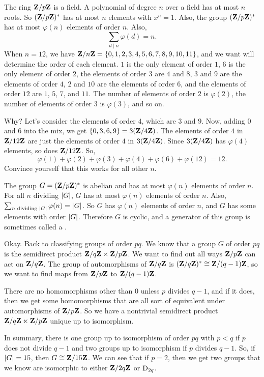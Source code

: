 \documentclass[11pt, oneside]{amsart}
\begin{document}
The ring $\mathbf Z / p\mathbf Z$ is a field. A polynomial of degree $n$ over a field has at most $n$ roots. So $(\mathbf Z / p\mathbf Z)^*$ has at most $n$ elements with $x^n = 1$. Also, the group $(\mathbf Z / p\mathbf Z)^*$ has at most $\varphi(n)$ elements of order $n$. Also, 
$$
\sum_{d\mid n} \varphi(d) = n.
$$
When $n=12$, we have $\mathbf Z / n\mathbf Z = \{0,1,2,3,4,5,6,7,8,9,10,11\}$, and we want will determine the order of each element. $1$ is the only element of order $1$, $6$ is the only element of order $2$, the elements of order $3$ are $4$ and $8$, $3$ and $9$ are the elements of order $4$, $2$ and $10$ are the elements of order $6$, and the elements of order $12$ are $1$, $5$, $7$, and $11$. The number of elements of order $2$ is $\varphi(2)$, the number of elements of order $3$ is $\varphi(3)$, and so on. 

Why? Let's consider the elements of order $4$, which are $3$ and $9$. Now, adding $0$ and $6$ into the mix, we get $ \{0,3,6,9\} = 3(\mathbf Z / 4\mathbf Z)$. The elements of order $4$ in $\mathbf Z / 12\mathbf Z$ are just the elements of order $4$ in $3(\mathbf Z / 4\mathbf Z)$. Since $3(\mathbf Z / 4\mathbf Z)$ has $\varphi(4) $ elements, so does $\mathbf Z / 12\mathbf Z$. So, 
$$
\varphi (1) + \varphi (2)  + \varphi (3) + \varphi (4) + \varphi (6) + \varphi (12) = 12.
$$
Convince yourself that this works for all other $n$.

The group $G = (\mathbf Z / p\mathbf Z)^*$ is abelian and has at most $\varphi (n) $ elements of order $n$. For all $n$ dividing $\left \lvert G \right \rvert$, $G$ has at most $\varphi(n)$ elements of order $n$. Also, $\sum_{n \textrm{ dividing } \left \lvert G \right \rvert} \varphi(n) = \left \lvert G \right \rvert$. So $G$ has $\varphi(n)$ elements of order $n$, and $G$ has some elements with order $\left \lvert G \right \rvert$. Therefore $G$ is cyclic, and a generator of this group is sometimes called a .

Okay. Back to classifying groups of order $pq$. We know that a group $G$ of order $pq$ is the semidirect product $\mathbf Z/q\mathbf Z \ltimes \mathbf Z / p\mathbf Z$. We want to find out all ways $\mathbf Z / p\mathbf Z$ can act on $\mathbf Z / q\mathbf Z$. The group of automorphisms of $\mathbf Z / q\mathbf Z$ is $(\mathbf Z / q\mathbf Z)^* \cong \mathbf Z/(q-1)\mathbf Z$, so we want to find maps from $\mathbf Z/p\mathbf Z$ to $\mathbf Z/(q-1)\mathbf Z$.

There are no homomorphisms other than $0$ unless $p$ divides $q-1$, and if it does, then we get some homomorphisms that are all sort of equivalent under automorphisms of $\mathbf Z/p\mathbf Z$. So we have a nontrivial semidirect product $\mathbf Z/q\mathbf Z \ltimes \mathbf Z/p\mathbf Z$ unique up to isomorphism. 

In summary, there is one group up to isomorphism of order $pq$ with $p<q$ if $p$ does not divide $q-1$ and two groups up to isomorphism if $p$ divides $q-1$. So, if $\left \lvert G \right \rvert = 15$, then $G \cong \mathbf Z/15\mathbf Z$. We can see that if $p=2$, then we get two groups that we know are isomorphic to either $\mathbf Z/2q\mathbf Z$ or $\operatorname{D}_{2q}$.
\end{document}
